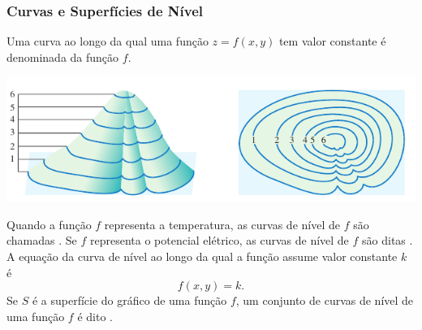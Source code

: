 \begin{frame}[label=funcoes]
\frametitle{Curvas e Superfícies de Nível }

Uma curva ao longo da qual uma função $z=f(x,y)$ tem valor constante é denominada  da função $f$.

\begin{center}
\includegraphics[scale=0.5]{figuras/nivel1.png}
\end{center}

 Quando a função $f$ representa a temperatura, as curvas de nível de $f$ são chamadas . Se $f$ representa o potencial elétrico, as curvas de nível de $f$ são ditas . A equação da curva de nível ao longo da qual a função assume valor constante $k$ é
$$f(x,y)=k.$$
Se $S$ é a superfície do gráfico de uma função $f$, um conjunto de curvas de nível de uma função $f$ é dito .



\end{frame}

\begin{frame}[label=funcoes]
\end{frame}

